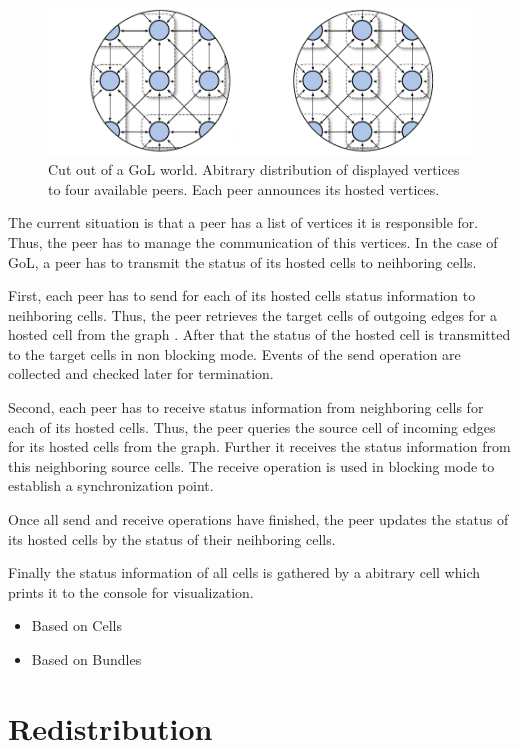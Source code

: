   \begin{figure}[H]
    \centering \includegraphics[width=\textwidth]{graphics/40_gol_mapping}
    \caption{Cut out of a GoL world. Abitrary distribution of
      displayed vertices to four available peers. Each peer announces
      its hosted vertices.}
    \label{fig:gol_mapping}
  \end{figure}

  The current situation is that a peer has a list of vertices it is
  responsible for. Thus, the peer has to manage the communication of
  this vertices. In the case of GoL, a peer has to transmit the status
  of its hosted cells to neihboring cells.
  
  First, each peer has to send for each of its hosted cells status
  information to neihboring cells. Thus, the peer retrieves the target
  cells of outgoing edges for a hosted cell from the graph . After
  that the status of the hosted cell is transmitted to the target
  cells in non blocking mode. Events of the send operation are
  collected and checked later for termination.

  Second, each peer has to receive status information from neighboring
  cells for each of its hosted cells. Thus, the peer queries the
  source cell of incoming edges for its hosted cells from the
  graph. Further it receives the status information from this
  neighboring source cells.  The receive operation is used in blocking
  mode to establish a synchronization point.

  Once all send and receive operations have finished, the peer updates
  the status of its hosted cells by the status of their neihboring
  cells.

  Finally the status information of all cells is gathered by a
  abitrary cell which prints it to the console for visualization.




  \begin{itemize}
  \item Based on Cells
  \item Based on Bundles
  \end{itemize}

\section{Redistribution}






\cleardoublepage

